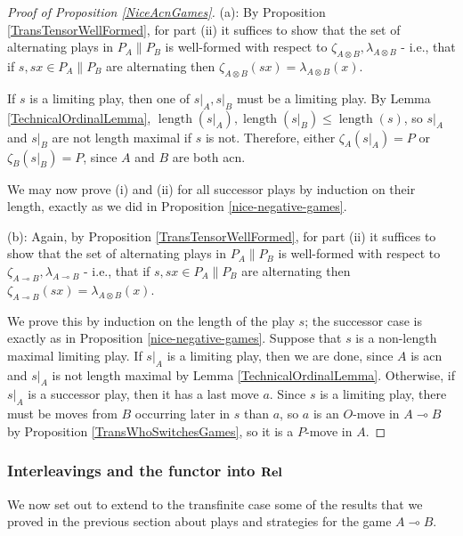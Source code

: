 \documentclass[11pt]{article} %
\theoremstyle{plain} %
\theoremstyle{definition} %
\theoremstyle{note}
\theoremstyle{exercisestyle}
\newcommand{\catname}[1]{{\normalfont\textbf{#1}}}
\newcommand{\Rel}{\catname{Rel}}
\newcommand{\tensor}{\otimes}
\renewcommand{\implies}{\multimap}
\DeclareMathOperator{\length}{length}
\begin{document}
\begin{proof}[Proof of Proposition \ref{NiceAcnGames}]
  (a): By Proposition \ref{TransTensorWellFormed}, for part (ii) it suffices to show that the set of alternating plays in $P_A\|P_B$ is well-formed with respect to $\zeta_{A\tensor B},\lambda_{A\tensor B}$ - i.e., that if $s,sx\in P_A\|P_B$ are alternating then $\zeta_{A\tensor B}(sx)=\lambda_{A\tensor B}(x)$.

  If $s$ is a limiting play, then one of $s\vert_A,s\vert_B$ must be a limiting play.  By Lemma \ref{TechnicalOrdinalLemma}, $\length(s\vert_A),\length(s\vert_B)\le\length(s)$, so $s\vert_A$ and $s\vert_B$ are not length maximal if $s$ is not.  Therefore, either $\zeta_A(s\vert_A)=P$ or $\zeta_B(s\vert_B)=P$, since $A$ and $B$ are both acn.  

  We may now prove (i) and (ii) for all successor plays by induction on their length, exactly as we did in Proposition \ref{nice-negative-games}.  

  (b): Again, by Proposition \ref{TransTensorWellFormed}, for part (ii) it suffices to show that the set of alternating plays in $P_A\|P_B$ is well-formed with respect to $\zeta_{A\implies B},\lambda_{A\implies B}$ - i.e., that if $s,sx\in P_A\|P_B$ are alternating then $\zeta_{A\implies B}(sx)=\lambda_{A\tensor B}(x)$.  

  We prove this by induction on the length of the play $s$; the successor case is exactly as in Proposition \ref{nice-negative-games}.  Suppose that $s$ is a non-length maximal limiting play.  If $s\vert_A$ is a limiting play, then we are done, since $A$ is acn and $s\vert_A$ is not length maximal by Lemma \ref{TechnicalOrdinalLemma}.  Otherwise, if $s\vert_A$ is a successor play, then it has a last move $a$.  Since $s$ is a limiting play, there must be moves from $B$ occurring later in $s$ than $a$, so $a$ is an $O$-move in $A\implies B$ by Proposition \ref{TransWhoSwitchesGames}, so it is a $P$-move in $A$.
\end{proof}

\subsubsection{Interleavings and the functor into $\Rel$}

We now set out to extend to the transfinite case some of the results that we proved in the previous section about plays and strategies for the game $A\implies B$.
\end{document}
